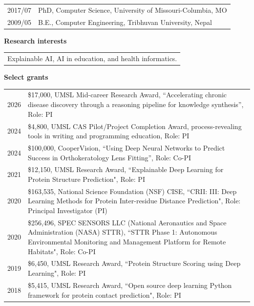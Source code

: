 \documentclass[11pt]{article}
\begin{document}
\begin{tabular}{ l l }
2017/07	& PhD, Computer Science, University of Missouri-Columbia, MO \\
2009/05	& B.E., Computer Engineering, Tribhuvan University, Nepal
\end{tabular}

\vspace{0.5cm}

\textbf{Research interests}

\vspace{0.5cm}

\begin{tabular}{ l }
Explainable AI, AI in education, and health informatics.
\end{tabular}

\vspace{0.5cm}

\textbf{Select grants}


\vspace{0.5cm}

\begin{tabular}{ l >{\raggedright\arraybackslash}p{13cm} }
2026 & \$17,000, UMSL Mid-career Research Award, ``Accelerating chronic disease discovery through a reasoning pipeline for knowledge synthesis'', Role: PI \\
2024 & \$4,800, UMSL CAS Pilot/Project Completion Award, process-revealing tools in writing and programming education, Role: PI \\
2024 & \$100,000, CooperVision, ``Using Deep Neural Networks to Predict Success in Orthokeratology Lens Fitting'', Role: Co-PI \\
2021 & \$12,150, UMSL Research Award, ``Explainable
Deep Learning for Protein Structure Prediction", Role: PI \\
2020 & \$163,535, National Science Foundation (NSF) CISE, ``CRII: III: Deep Learning Methods for Protein Inter-residue Distance Prediction", Role: Principal Investigator (PI) \\
2020 & \$256,496, SPEC SENSORS LLC (National Aeronautics and Space Administration (NASA) STTR), ``STTR Phase 1: Autonomous Environmental Monitoring and Management Platform for Remote Habitats", Role: Co-PI\\
2019 & \$6,450, UMSL Research Award, ``Protein Structure Scoring using Deep Learning", Role: PI \\
2018 & \$5,415, UMSL Research Award, ``Open source deep learning Python framework for protein contact prediction", Role: PI \\
\end{tabular}
\end{document}
